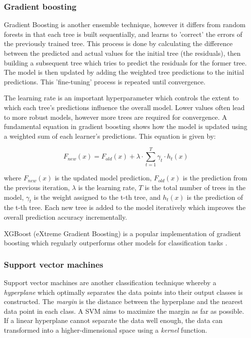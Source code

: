 \subsubsection{Gradient boosting}

Gradient Boosting is another ensemble technique, however it differs from random forests in that each tree is built sequentially, and learns to 'correct' the errors of the previously trained tree. This process is done by calculating the difference between the predicted and actual values for the initial tree (the residuals), then building a subsequent tree which tries to predict the residuals for the former tree. The model is then updated by adding the weighted tree predictions to the initial predictions. This 'fine-tuning' process is repeated until convergence. 

The learning rate is an important hyperparameter which controls the extent to which each tree's predictions influence the overall model. Lower values often lead to more robust models, however more trees are required for convergence. A fundamental equation in gradient boosting shows how the model is updated using a weighted sum of each learner's predictions. This equation is given by:

\[ F_{new}(x) = F_{old}(x) + \lambda \cdot \sum_{t=1}^{T} \gamma_t \cdot h_t(x) \]

where $F_{new}(x)$ is the updated model prediction, $F_{old}(x)$ is the prediction from the previous iteration, $\lambda$ is the learning rate, $T$ is the total number of trees in the model, $\gamma_t$ is the weight assigned to the t-th tree, and $h_t(x)$ is the prediction of the t-th tree. Each new tree is added to the model iteratively which improves the overall prediction accuracy incrementally.

XGBoost (eXtreme Gradient Boosting) is a popular implementation of gradient boosting which regularly outperforms other models for classification tasks \cite{gradboostingwins}.

\subsubsection{Support vector machines}

Support vector machines are another classification technique whereby a \textit{hyperplane} which optimally separates the data points into their output classes is constructed. The \textit{margin} is the distance between the hyperplane and the nearest data point in each class. A SVM aims to maximize the margin as far as possible. If a linear hyperplane cannot separate the data well enough, the data can transformed into a higher-dimensional space using a \textit{kernel} function.

